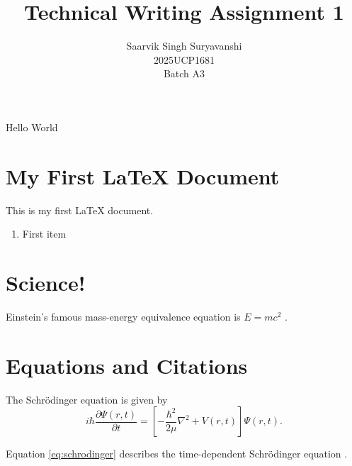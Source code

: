 \documentclass[12pt,a4paper]{article}
\title{Technical Writing Assignment 1}
\author{Saarvik Singh Suryavanshi\\2025UCP1681\\Batch A3}
\date{}
\begin{document}
\maketitle

Hello World

\tableofcontents

\section{My First LaTeX Document}

This is my first LaTeX document.

\begin{enumerate}
    \item First item
\end{enumerate}

\section{Science!}

Einstein's famous mass-energy equivalence equation is \(E=mc^2\) \citep{einstein1905}.

\section{Equations and Citations}

The Schrödinger equation is given by
\begin{equation}
i\hbar\frac{\partial \Psi(r,t)}{\partial t}
=
\left[-\frac{\hbar^2}{2\mu}\nabla^2+V(r,t)\right]\Psi(r,t).
\label{eq:schrodinger}
\end{equation}

Equation \ref{eq:schrodinger} describes the time-dependent Schrödinger equation \citep{schrodinger1926}.



\end{document}
